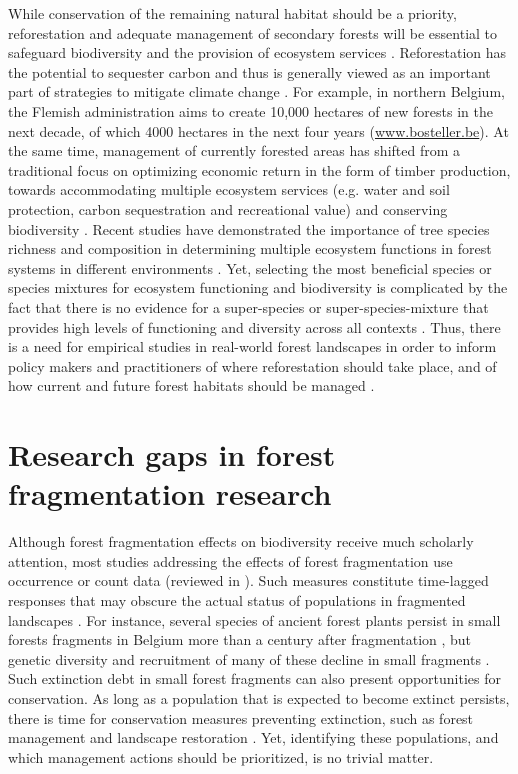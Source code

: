 \documentclass[10pt, twoside]{book} %
\begin{document}
While conservation of the remaining natural habitat should be a priority, reforestation and adequate management of secondary forests will be essential to safeguard biodiversity and the provision of ecosystem services \citep{Perring2018}. Reforestation has the potential to sequester carbon and thus is generally viewed as an important part of strategies to mitigate climate change \citep{Bastin2019}. For example, in northern Belgium, the Flemish administration aims to create 10,000 hectares of new forests in the next decade, of which 4000 hectares in the next four years (\url{www.bosteller.be}). At the same time, management of currently forested areas has shifted from a traditional focus on optimizing economic return in the form of timber production, towards accommodating multiple ecosystem services (e.g. water and soil protection, carbon sequestration and recreational value) and conserving biodiversity \citep{Pawson2013, Puettmann2015, Coll2018}. Recent studies have demonstrated the importance of tree species richness and composition in determining multiple ecosystem functions in forest systems in different environments \citep{Ratcliffe2017, Baeten2019, Hertzog2019}. Yet, selecting the most beneficial species or species mixtures for ecosystem functioning and biodiversity is complicated by the fact that there is no evidence for a super-species or super-species-mixture that provides high levels of functioning and diversity across all contexts \citep{VanderPlas2016}. Thus, there is a need for empirical studies in real-world forest landscapes in order to inform policy makers and practitioners of where reforestation should take place, and of how current and future forest habitats should be managed \citep{Watts2016, Coll2018}.

\clearpage	
	\section{Research gaps in forest fragmentation research}
	
Although forest fragmentation effects on biodiversity receive much scholarly attention, most studies addressing the effects of forest fragmentation use occurrence or count data (reviewed in \citealt{Fardila2017}). Such measures constitute time-lagged responses that may obscure the actual status of populations in fragmented landscapes \citep{Ewers2006}. For instance, several species of ancient forest plants persist in small forests fragments in Belgium more than a century after fragmentation \citep{Vellend2006}, but genetic diversity and recruitment of many of these decline in small fragments \citep{Jacquemyn2002, Jacquemyn2007, Vandepitte2007}. Such extinction debt in small forest fragments can also present opportunities for conservation. As long as a population that is expected to become extinct persists, there is time for conservation measures preventing extinction, such as forest management and landscape restoration \citep{Kuussaari2009}. Yet, identifying these populations, and which management actions should be prioritized, is no trivial matter.\\
\end{document}
